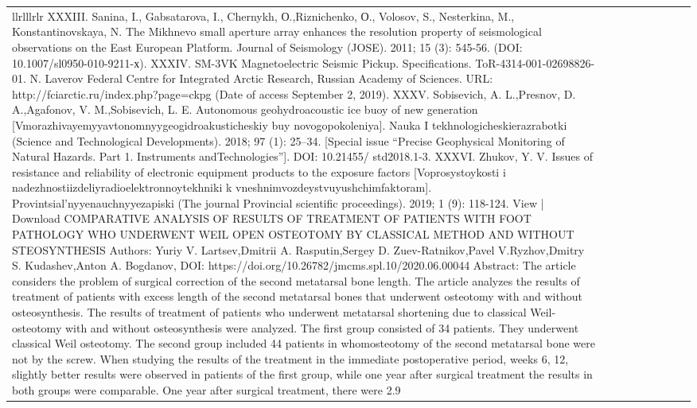\begin{longtable}{lllllllll}{llrlllrlr}
XXXIII. Sanina, I., Gabsatarova, I., Chernykh, О.,Riznichenko, О., Volosov, S., Nesterkina, M., Konstantinovskaya, N. The Mikhnevo small aperture array enhances the resolution property of seismological observations on the East European Platform. Journal of Seismology (JOSE). 2011; 15 (3): 545-56. (DOI: 10.1007/sl0950-010-9211-х).  XXXIV. SM-3VK Magnetoelectric Seismic Pickup. Specifications. ToR-4314-001-02698826-01. N. Laverov Federal Centre for Integrated Arctic Research, Russian Academy of Sciences. URL: http://fciarctic.ru/index.php?page=ckpg (Date of access September 2, 2019).  XXXV. Sobisevich, A. L.,Presnov, D. A.,Agafonov, V. M.,Sobisevich, L. E. Autonomous geohydroacoustic ice buoy of new generation [Vmorazhivayemyyavtonomnyygeogidroakusticheskiy buy novogopokoleniya]. Nauka I tekhnologicheskierazrabotki (Science and Technological Developments). 2018; 97 (1): 25–34. [Special issue “Precise Geophysical Monitoring of Natural Hazards. Part 1. Instruments andTechnologies”]. DOI: 10.21455/ std2018.1-3.  XXXVI. Zhukov, Y. V. Issues of resistance and reliability of electronic equipment products to the exposure factors [Voprosystoykosti i nadezhnostiizdeliyradioelektronnoytekhniki k vneshnimvozdeystvuyushchimfaktoram]. Provintsial’nyyenauchnyyezapiski (The journal Provincial scientific proceedings). 2019; 1 (9): 118-124. View | Download COMPARATIVE ANALYSIS OF RESULTS OF TREATMENT OF PATIENTS WITH FOOT PATHOLOGY WHO UNDERWENT WEIL OPEN OSTEOTOMY BY CLASSICAL METHOD AND WITHOUT STEOSYNTHESIS Authors: Yuriy V. Lartsev,Dmitrii A. Rasputin,Sergey D. Zuev-Ratnikov,Pavel V.Ryzhov,Dmitry S. Kudashev,Anton A. Bogdanov, DOI: https://doi.org/10.26782/jmcms.spl.10/2020.06.00044	 Abstract:  The article considers the problem of surgical correction of the second metatarsal bone length. The article analyzes the results of treatment of patients with excess length of the second metatarsal bones that underwent osteotomy with and without osteosynthesis. The results of treatment of patients who underwent metatarsal shortening due to classical Weil-osteotomy with and without osteosynthesis were analyzed. The first group consisted of 34 patients. They underwent classical Weil osteotomy. The second group included 44 patients in whomosteotomy of the second metatarsal bone were not by the screw. When studying the results of the treatment in the immediate postoperative period, weeks 6, 12, slightly better results were observed in patients of the first group, while one year after surgical treatment the results in both groups were comparable. One year after surgical treatment, there were 2.9%
\end{longtable}
